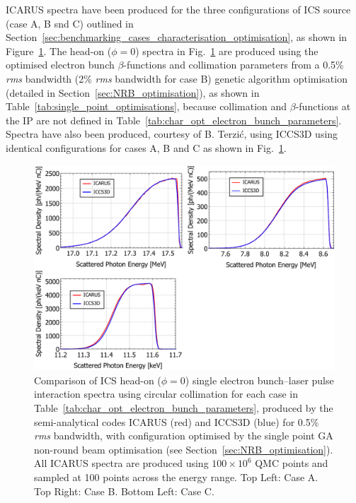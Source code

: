 \documentclass[../main.tex]{subfiles}
\begin{document}
\textsc{ICARUS} spectra have been produced for the three configurations of ICS source (case A, B snd C) outlined in Section~\ref{sec:benchmarking_cases_characterisation_optimisation}, as shown in Figure~\ref{fig:ICARUS_optimised_benchmarking}. The head-on ($\phi=0$) spectra in Fig.~\ref{fig:ICARUS_optimised_benchmarking} are produced using the optimised electron bunch $\beta$-functions and collimation parameters from a 0.5\% \textit{rms} bandwidth (2\% \textit{rms} bandwidth for case B) genetic algorithm optimisation (detailed in Section~\ref{sec:NRB_optimisation}), as shown in Table~\ref{tab:single_point_optimisations}, because collimation and $\beta$-functions at the IP are not defined in Table~\ref{tab:char_opt_electron_bunch_parameters}. Spectra have also been produced, courtesy of B. Terzi\'{c}, using \textsc{ICCS3D} using identical configurations for cases A, B and C as shown in Fig.~\ref{fig:ICARUS_optimised_benchmarking}.       

\begin{figure}[!h]
\centering
\includegraphics[width=\textwidth]{Figures/Optimisation_and_Characterisation_of_Inverse_Compton_Scattering_Sources/ICARUS_ICCS3D_cases_comparison.pdf}
\caption{Comparison of ICS head-on ($\phi=0$) single electron bunch--laser pulse interaction spectra using circular collimation for each case in Table~\ref{tab:char_opt_electron_bunch_parameters}, produced by the semi-analytical codes \textsc{ICARUS} (red) and \textsc{ICCS3D} (blue) for 0.5\% \textit{rms} bandwidth, with configuration optimised by the single point GA non-round beam optimisation  (see Section~\ref{sec:NRB_optimisation}). All \textsc{ICARUS} spectra are produced using $100\times 10^{6}$ QMC points and sampled at 100 points across the energy range. Top Left: Case A. Top Right: Case B. Bottom Left: Case C.}
\label{fig:ICARUS_optimised_benchmarking}
\end{figure}
\end{document}
